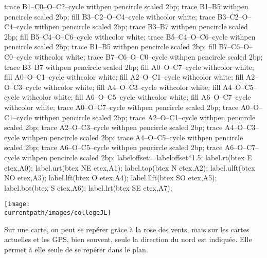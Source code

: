 \begin{changemargin}{-10mm}{-10mm}
\begin{definition}
\begin{minipage}{0.4\linewidth}
{\begin{Geometrie}[CoinBG={(-3u,-3.5u)},CoinHD={(3u,3u)}]
               trace B1--C0--O--C2--cycle withpen pencircle scaled 2bp;
               trace B1--B5 withpen pencircle scaled 2bp;
               fill B3--C2--O--C4--cycle withcolor white;
               trace B3--C2--O--C4--cycle withpen pencircle scaled 2bp;
               trace B3--B7 withpen pencircle scaled 2bp;
               fill B5--C4--O--C6--cycle withcolor white;
               trace B5--C4--O--C6--cycle withpen pencircle scaled 2bp;
               trace B1--B5 withpen pencircle scaled 2bp;
               fill B7--C6--O--C0--cycle withcolor white;
               trace B7--C6--O--C0--cycle withpen pencircle scaled 2bp;
               trace B3--B7 withpen pencircle scaled 2bp;
               fill A0--O--C7--cycle withcolor white;
               fill A0--O--C1--cycle withcolor white;
               fill A2--O--C1--cycle withcolor white;
               fill A2--O--C3--cycle withcolor white;
               fill A4--O--C3--cycle withcolor white;
               fill A4--O--C5--cycle withcolor white;
               fill A6--O--C5--cycle withcolor white;
               fill A6--O--C7--cycle withcolor white;            
               trace A0--O--C7--cycle withpen pencircle scaled 2bp;
               trace A0--O--C1--cycle withpen pencircle scaled 2bp;
               trace A2--O--C1--cycle withpen pencircle scaled 2bp;
               trace A2--O--C3--cycle withpen pencircle scaled 2bp;
               trace A4--O--C3--cycle withpen pencircle scaled 2bp;
               trace A4--O--C5--cycle withpen pencircle scaled 2bp;
               trace A6--O--C5--cycle withpen pencircle scaled 2bp;
               trace A6--O--C7--cycle withpen pencircle scaled 2bp;
               labeloffset:=labeloffset*1.5;
               label.rt(btex E etex,A0);
               label.urt(btex NE etex,A1);
               label.top(btex N etex,A2);
               label.ulft(btex NO etex,A3);
               label.lft(btex O etex,A4);
               label.llft(btex SO etex,A5);
               label.bot(btex S etex,A6);
               label.lrt(btex SE etex,A7);
            \end{Geometrie}
         }
      \end{minipage}
   \end{definition}

   \begin{center}
      \begin{minipage}{0.45\linewidth}
         \texttt{[image: \\currentpath/images/collegeJL]}
      \end{minipage}
      \qquad
      \begin{minipage}{0.45\linewidth}
         Sur une carte, on peut se repérer grâce à la rose des vents, mais sur les cartes actuelles et les GPS, bien souvent, seule la direction du nord est indiquée. Elle permet à elle seule de se repérer dans le plan.
      \end{minipage}
   \end{center}
\end{changemargin}